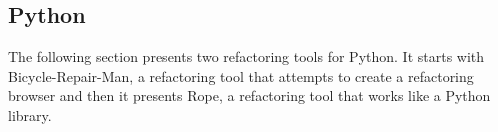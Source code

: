 \subsection{Python}

The following section presents two refactoring tools for Python. It starts with Bicycle-Repair-Man, a refactoring tool that attempts to create a refactoring browser and then it presents Rope, a refactoring tool that works like a Python library.



